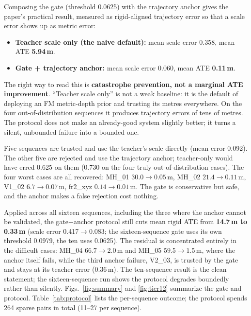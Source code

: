 Composing the gate (threshold 0.0625) with the trajectory anchor gives the
paper's practical result, measured as rigid-aligned trajectory error so that a
scale error shows up as metric error:

\begin{itemize}
\item \textbf{Teacher scale only (the naive default):} mean scale error 0.358,
  mean ATE \textbf{5.94\,m}.
\item \textbf{Gate + trajectory anchor:} mean scale error 0.060, mean ATE
  \textbf{0.11\,m}.
\end{itemize}

\noindent The right way to read this is \textbf{catastrophe prevention, not a
marginal ATE improvement}. ``Teacher scale only'' is not a weak baseline: it is
the default of deploying an FM metric-depth prior and trusting its metres
everywhere. On the four out-of-distribution sequences it produces trajectory
errors of tens of metres. The protocol does not make an already-good system
slightly better; it turns a silent, unbounded failure into a bounded one.

\noindent Five sequences are trusted and use the teacher's scale directly (mean
error 0.092). The other five are rejected and use the trajectory anchor;
teacher-only would have erred 0.625 on them (0.730 on the four truly
out-of-distribution cases). The four worst cases are all recovered: MH\_01
$30.0\to0.05$\,m, MH\_02 $21.4\to0.11$\,m, V1\_02 $6.7\to0.07$\,m, fr2\_xyz
$0.14\to0.01$\,m. The gate is conservative but safe, and the anchor makes a false
rejection cost nothing.

\noindent Applied across all sixteen sequences, including the three where the
anchor cannot be validated, the gate+anchor protocol still cuts mean rigid ATE
from \textbf{14.7\,m to 0.33\,m} (scale error 0.417$\to$0.083; the
sixteen-sequence gate uses its own threshold 0.0979, the ten uses 0.0625). The
residual is concentrated entirely in the difficult cases: MH\_04 $66.7\to2.0$\,m
and MH\_05 $59.5\to1.5$\,m, where the anchor itself fails, while the third anchor
failure, V2\_03, is trusted by the gate and stays at its teacher error
(0.36\,m). The ten-sequence result is the clean statement; the sixteen-sequence
run shows the protocol degrades boundedly rather than silently.
Figs.~\ref{fig:summary} and \ref{fig:tier12} summarize the gate and protocol.
Table~\ref{tab:protocol} lists the per-sequence outcome; the protocol spends 264
sparse pairs in total (11--27 per sequence).

